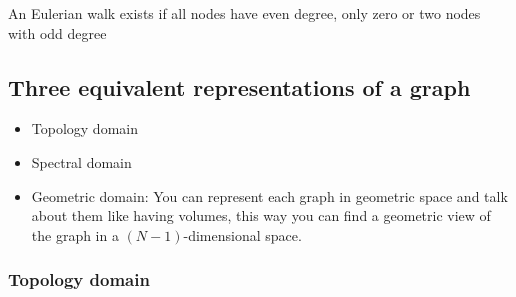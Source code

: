 An Eulerian walk exists if all nodes have even degree, only zero or two nodes with odd degree

\subsection{Three equivalent representations of a graph}

\begin{itemize}
  \item Topology domain
  \item Spectral domain
  \item Geometric domain: You can represent each graph in geometric space and talk about
  them like having volumes, this way you can find a geometric view of the graph in a 
  $(N-1)$-dimensional space.
  
\end{itemize}

\subsubsection{Topology domain}

